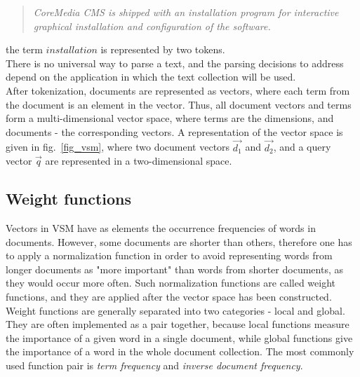 \begin{quote}
\textit{CoreMedia CMS is shipped with an installation program for interactive graphical installation and configuration of the software.}
\end{quote}

the term $ installation $ is represented by two tokens. \\

There is no universal way to parse a text, and the parsing decisions to address depend on the application in which the text collection will be used. \\

After tokenization, documents are represented as vectors, where each term from the document is an element in the vector. Thus, all document vectors and terms form a multi-dimensional vector space, where terms are the dimensions, and documents - the corresponding vectors. A representation of the vector space is given in fig.~\ref{fig_vsm}, where two document vectors $\vec{d_{1}}$ and $\vec{d_{2}}$, and a query vector $\vec{q}$ are represented in a two-dimensional space. \\

\subsection{Weight functions}
\label{lsa:weight_functions}
Vectors in \gls{VSM} have as elements the occurrence frequencies of words in documents. However, some documents are shorter than others, therefore one has to apply a normalization function in order to avoid representing words from longer documents as "more important" than words from shorter documents, as they would occur more often. Such normalization functions are called weight functions, and they are applied after the vector space has been constructed. \\

Weight functions are generally separated into two categories - local and global. They are often implemented as a pair together, because local functions measure the importance of a given word in a single document, while global functions give the importance of a word in the whole document collection. The most commonly used function pair is \textit{term frequency} and \textit{inverse document frequency}. \\


